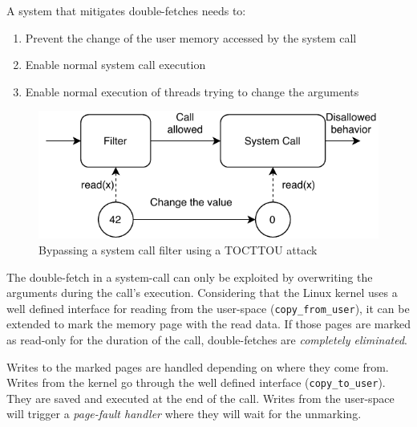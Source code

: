 
A system that mitigates double-fetches needs to:
\begin{enumerate}
  \item Prevent the change of the user memory accessed by the system call
  \item Enable normal system call execution
  \item Enable normal execution of threads trying to change the arguments
\end{enumerate}


\begin{figure}[]
  \centering
  \includegraphics[width=.85\linewidth]{img/tocttou.pdf}
  \caption{Bypassing a system call filter using a TOCTTOU attack}
  \label{fig:tocttou}
\end{figure}

The double-fetch in a system-call can only be exploited by overwriting the
arguments during the call's execution. Considering that the Linux kernel uses a
well defined interface for reading from the user-space
(\texttt{copy\_from\_user}), it can be extended to mark the memory page with the
read data. If those pages are marked as read-only for the duration of the call,
double-fetches are \emph{completely eliminated}.

Writes to the marked pages are handled depending on where they come from. Writes
from the kernel go through the well defined interface (\texttt{copy\_to\_user}).
They are saved and executed at the end of the call. Writes from the user-space
will trigger a \emph{page-fault handler} where they will wait for the unmarking.

